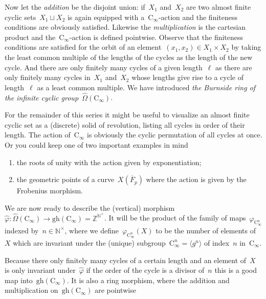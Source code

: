 Now let the \emph{addition} be the disjoint union: if~$X_1$ and~$X_2$ are two almost finite cyclic sets~$X_1\sqcup X_2$ is again equipped with a~$\mathrm{C}_\infty$\nobreakdash-action and the finiteness conditions are obviously satisfied. Likewise the \emph{multiplication} is the cartesian product and the~$\mathrm{C}_\infty$\nobreakdash-action is defined pointwise. Observe that the finiteness conditions are satisfied for the orbit of an element~$(x_1,x_2)\in X_1\times X_2$ by taking the least common multiple of the lengths of the cycles as the length of the new cycle. And there are only finitely many cycles of a given length~$\ell$ as there are only finitely many cycles in~$X_1$ and~$X_2$ whose lengths give rise to a cycle of length~$\ell$ as a least common multiple. We have introduced \emph{the Burnside ring of the infinite cyclic group~$\hat{\Omega}(\mathrm{C}_\infty)$}.

For the remainder of this series it might be useful to visualize an almost finite cyclic set as a (discrete) solid of revolution, listing all cycles in order of their length. The action of~$\mathrm{C}_\infty$ is obviously the cyclic permutation of all cycles at once. Or you could keep one of two important examples in mind
\begin{enumerate}
  \item the roots of unity with the action given by exponentiation;
  \item the geometric points of a curve~$X(\overline{F}_p)$ where the action is given by the Frobenius morphism.
\end{enumerate}

We are now ready to describe the (vertical) morphism~$\hat{\varphi}\colon\hat{\Omega}(\mathrm{C}_\infty)\to\mathrm{gh}(\mathrm{C}_\infty)=\mathbb{Z}^{\mathbb{N}^\times}$. It will be the product of the family of maps~$\varphi_{\mathrm{C}_\infty^n}$ indexed by~$n\in\mathbb{N}^\times$, where we define~$\varphi_{\mathrm{C}_\infty^n}(X)$ to be the number of elements of~$X$ which are invariant under the (unique) subgroup~$\mathrm{C}_\infty^n=\langle g^n\rangle$ of index~$n$ in~$\mathrm{C}_\infty$.

Because there only finitely many cycles of a certain length and an element of~$X$ is only invariant under~$\hat{\varphi}$ if the order of the cycle is a divisor of~$n$ this is a good map into~$\mathrm{gh}(\mathrm{C}_\infty)$. It is also a ring morphism, where the addition and multiplication on~$\mathrm{gh}(\mathrm{C}_\infty)$ are pointwise

